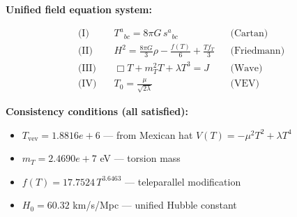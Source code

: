 
\textbf{Unified field equation system:}

\begin{align}
  \text{(I)} \quad & T^a{}_{bc} = 8\pi G \, s^a{}_{bc} && \text{(Cartan)} \\
  \text{(II)} \quad & H^2 = \frac{8\pi G}{3}\rho - \frac{f(T)}{6} + \frac{Tf_T}{3} && \text{(Friedmann)} \\
  \text{(III)} \quad & \Box T + m_T^2 T + \lambda T^3 = J && \text{(Wave)} \\
  \text{(IV)} \quad & T_0 = \frac{\mu}{\sqrt{2\lambda}} && \text{(VEV)}
\end{align}

\textbf{Consistency conditions (all satisfied):}
\begin{itemize}
  \item $T_{\text{vev}} = 1.8816e+6$ — from Mexican hat $V(T) = -\mu^2 T^2 + \lambda T^4$
  \item $m_T = 2.4690e+7$ eV — torsion mass
  \item $f(T) = 17.7524 \, T^{3.6463}$ — teleparallel modification
  \item $H_0 = 60.32$ km/s/Mpc — unified Hubble constant
\end{itemize}